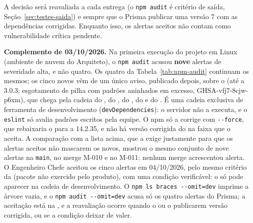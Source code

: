 A decisão será reavaliada a cada entrega (o \texttt{npm audit} é critério de saída, Seção~\ref{sec:testes-saida}) e sempre que o Prisma publicar uma versão 7 com as dependências corrigidas. Enquanto isso, os alertas aceitos não contam como vulnerabilidade crítica pendente.

\textbf{Complemento de 03/10/2026.} Na primeira execução do projeto em Linux (ambiente de nuvem do Arquiteto), o \texttt{npm audit} acusou \textbf{nove} alertas de severidade alta, e não quatro. Os quatro da Tabela~\ref{tab:npm-audit} continuam os mesmos; os cinco novos vêm de um único aviso, publicado depois, sobre o  (até a 3.0.3; esgotamento de pilha com padrões aninhados em excesso, GHSA-vfj7-8cjw-p6xm), que chega pela cadeia do , do , do , do  e do . É uma cadeia exclusiva de ferramenta de desenvolvimento (\texttt{devDependencies}): o servidor não a executa, e o \texttt{eslint} só avalia padrões escritos pela equipe. O npm só a corrige com \texttt{-{}-force}, que rebaixaria o  para a 14.2.35, e não há versão corrigida do  na faixa que o  aceita. A comparação com a lista acima, que a  exige justamente para que os alertas aceitos não mascarem os novos, mostrou o mesmo conjunto de nove alertas na \texttt{main}, no merge M-010 e no M-011: nenhum merge acrescentou alerta. O Engenheiro Chefe aceitou os cinco alertas em 04/10/2026, pelo mesmo critério da  (pacote não exercido pelo produto), com uma condição verificável: o  só pode aparecer na cadeia de desenvolvimento. O \texttt{npm ls braces -{}-omit=dev} imprime a árvore vazia, e o \texttt{npm audit -{}-omit=dev} acusa só os quatro alertas do Prisma; a aceitação está na , e a reavaliação ocorre quando o  ou o  publicarem versão corrigida, ou se a condição deixar de valer.

